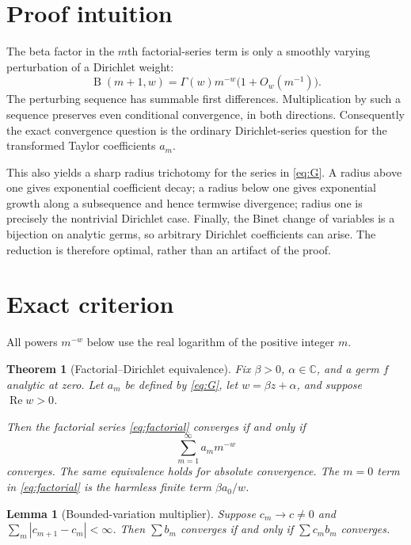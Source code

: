 \documentclass[11pt]{article}
\newtheorem{theorem}{Theorem}
\newtheorem{lemma}{Lemma}
\newcommand{\C}{\mathbb C}
\newcommand{\B}{\operatorname{B}}
\begin{document}
\section{Proof intuition}

The beta factor in the $m$th factorial-series term is only a smoothly varying
perturbation of a Dirichlet weight:
\[
 \B(m+1,w)=\Gamma(w)m^{-w}\bigl(1+O_w(m^{-1})\bigr).
\]
The perturbing sequence has summable first differences.  Multiplication by
such a sequence preserves even conditional convergence, in both directions.
Consequently the exact convergence question is the ordinary Dirichlet-series
question for the transformed Taylor coefficients $a_m$.

This also yields a sharp radius trichotomy for the series in
\eqref{eq:G}.  A radius above one gives exponential coefficient decay; a
radius below one gives exponential growth along a subsequence and hence
termwise divergence; radius one is precisely the nontrivial Dirichlet case.
Finally, the Binet change of variables is a bijection on analytic germs, so
arbitrary Dirichlet coefficients can arise.  The reduction is therefore
optimal, rather than an artifact of the proof.

\section{Exact criterion}

All powers $m^{-w}$ below use the real logarithm of the positive integer $m$.

\begin{theorem}[Factorial--Dirichlet equivalence]\label{thm:main}
Fix $\beta>0$, $\alpha\in\C$, and a germ $f$ analytic at zero.  Let $a_m$ be
defined by \eqref{eq:G}, let $w=\beta z+\alpha$, and suppose
$\operatorname{Re}w>0$.

Then the factorial series \eqref{eq:factorial} converges if and only if
\begin{equation}\label{eq:dirichlet}
 \sum_{m=1}^{\infty}a_m m^{-w}
\end{equation}
converges.  The same equivalence holds for absolute convergence.  The
$m=0$ term in \eqref{eq:factorial} is the harmless finite term $\beta a_0/w$.
\end{theorem}

\begin{lemma}[Bounded-variation multiplier]\label{lem:bv}
Suppose $c_m\to c\ne0$ and
$\sum_m|c_{m+1}-c_m|<\infty$.  Then $\sum b_m$ converges if and only if
$\sum c_m b_m$ converges.
\end{lemma}
\end{document}
